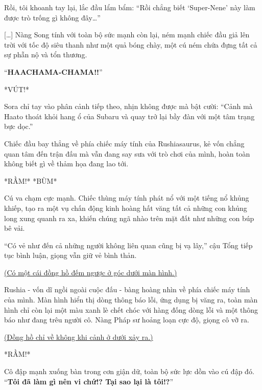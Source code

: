 \documentclass[../main.tex]{subfiles}
\begin{document}
Rồi, tôi khoanh tay lại, lắc đầu lẩm bẩm: ``Rồi chẳng biết `Super-Nene' này làm được trò trống gì không đây\dots''

{\color{gold}}   %


[\dots] Nàng Song tính với toàn bộ sức mạnh còn lại, ném mạnh chiếc đầu giả lên trời với tốc độ siêu thanh như một quả bóng chày, một cú ném chứa đựng tất cả sự phẫn nộ và tổn thương.

``{\Large\textbf{HAACHAMA-CHAMA!!}}''

*VÚT!*

Sora chỉ tay vào phân cảnh tiếp theo, nhịn không được mà bật cười: ``Cảnh mà Haato thoát khỏi hang ổ của Subaru và quay trở lại bầy đàn với một tâm trạng bực dọc.''

Chiếc đầu bay thẳng về phía chiếc máy tính của Rushiasaurus, kẻ vốn chẳng quan tâm đến trận đấu mà vẫn đang say sưa với trò chơi của mình, hoàn toàn không biết gì về thảm họa đang lao tới.

*RẦM!* *BÙM*

Cú va chạm cực mạnh. Chiếc thùng máy tính phát nổ với một tiếng nổ khủng khiếp, tạo ra một vụ chấn động kinh hoàng hất văng tất cả những con khủng long xung quanh ra xa, khiến chúng ngã nhào trên mặt đất như những con búp bê vải.

``Có vẻ như đến cả những người không liên quan cũng bị vạ lây,'' cậu Tổng tiếp tục bình luận, giọng vẫn giữ vẻ bình thản.

\begin{center}
  \uline{(Có một cái đồng hồ đếm ngược ở góc dưới màn hình.)}
\end{center}

Rushia - vốn dĩ ngồi ngoài cuộc đấu - bàng hoàng nhìn về phía chiếc máy tính của mình. Màn hình hiển thị dòng thông báo lỗi, ứng dụng bị văng ra, toàn màn hình chỉ còn lại một màu xanh lè chết chóc với hàng đống dòng lỗi và một thông báo như đang trêu người cô. Nàng Pháp sư hoảng loạn cực độ, giọng cô vỡ ra.

\begin{center}
  \uline{(Đồng hồ chỉ về không khi cảnh ở dưới xảy ra.)}
\end{center}

*RẦM!*

Cô đập mạnh xuống bàn trong cơn giận dữ, toàn bộ sức lực dồn vào cú đập đó. ``\textbf{Tôi đã làm gì nên vi chứ!? Tại sao lại là tôi!?}''
\end{document}
